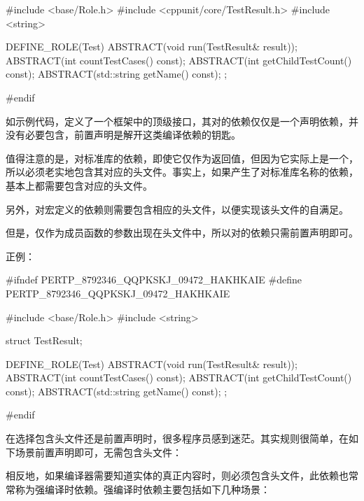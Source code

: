 \begin{content}
\begin{leftbar}
\begin{c++}[caption={cppunit/Test.h}]
#include <base/Role.h>
#include <cppunit/core/TestResult.h>
#include <string>

DEFINE_ROLE(Test)
{
    ABSTRACT(void run(TestResult& result));
    ABSTRACT(int countTestCases() const);
    ABSTRACT(int getChildTestCount() const);
    ABSTRACT(std::string getName() const);
};

#endif
\end{c++}
\end{leftbar}

如示例代码，定义了一个框架中的顶级接口，其对的依赖仅仅是一个声明依赖，并没有必要包含，前置声明是解开这类编译依赖的钥匙。

值得注意的是，对标准库的依赖，即使它仅作为返回值，但因为它实际上是一个，所以必须老实地包含其对应的头文件。事实上，如果产生了对标准库名称的依赖，基本上都需要包含对应的头文件。

另外，对宏定义的依赖则需要包含相应的头文件，以便实现该头文件的自满足。

但是，仅作为成员函数的参数出现在头文件中，所以对的依赖只需前置声明即可。

正例：
\begin{leftbar}
\begin{c++}[caption={cppunit/Test.h}]
#ifndef PERTP_8792346_QQPKSKJ_09472_HAKHKAIE
#define PERTP_8792346_QQPKSKJ_09472_HAKHKAIE

#include <base/Role.h>
#include <string>

struct TestResult;

DEFINE_ROLE(Test)
{
    ABSTRACT(void run(TestResult& result));
    ABSTRACT(int countTestCases() const);
    ABSTRACT(int getChildTestCount() const);
    ABSTRACT(std::string getName() const);
};

#endif
\end{c++}
\end{leftbar}

在选择包含头文件还是前置声明时，很多程序员感到迷茫。其实规则很简单，在如下场景前置声明即可，无需包含头文件：

\begin{enum}
\end{enum}

相反地，如果编译器需要知道实体的真正内容时，则必须包含头文件，此依赖也常常称为强编译时依赖。强编译时依赖主要包括如下几种场景：
\begin{enum}
\end{enum}


\end{content}
